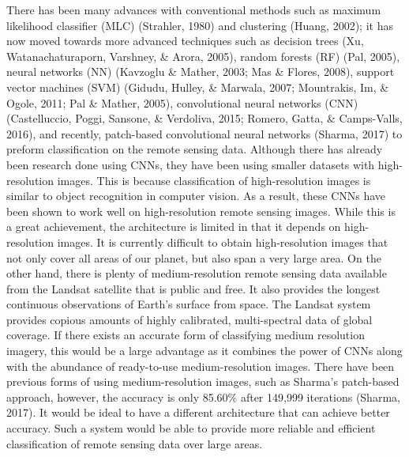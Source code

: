 \documentclass{article}
\begin{document}
There has been many advances with conventional methods such as maximum likelihood classifier (MLC) (Strahler, 1980) and clustering (Huang, 2002); it has now moved towards more advanced techniques such as decision trees (Xu, Watanachaturaporn, Varshney, \& Arora, 2005), random forests (RF) (Pal, 2005), neural networks (NN) (Kavzoglu \& Mather, 2003; Mas \& Flores, 2008), support vector machines (SVM) (Gidudu, Hulley, \& Marwala, 2007; Mountrakis, Im, \& Ogole, 2011; Pal \& Mather, 2005), convolutional neural networks (CNN) (Castelluccio, Poggi, Sansone, \& Verdoliva, 2015; Romero, Gatta, \& Camps-Valls, 2016), and recently, patch-based convolutional neural networks (Sharma, 2017) to preform classification on the remote sensing data. Although there has already been research done using CNNs, they have been using smaller datasets with high-resolution images. This is because classification of high-resolution images is similar to object recognition in computer vision. As a result, these CNNs have been shown to work well on high-resolution remote sensing images. While this is a great achievement, the architecture is limited in that it depends on high-resolution images. It is currently difficult to obtain high-resolution images that not only cover all areas of our planet, but also span a very large area. On the other hand, there is plenty of medium-resolution remote sensing data available from the Landsat satellite that is public and free. It also provides the longest continuous observations of Earth's surface from space. The Landsat system provides copious amounts of highly calibrated, multi-spectral data of global coverage. If there exists an accurate form of classifying medium resolution imagery, this would be a large advantage as it combines the power of CNNs along with the abundance of ready-to-use medium-resolution images. There have been previous forms of using medium-resolution images, such as Sharma’s patch-based approach, however, the accuracy is only 85.60\% after 149,999 iterations (Sharma, 2017). It would be ideal to have a different architecture that can achieve better accuracy. Such a system would be able to provide more reliable and efficient classification of remote sensing data over large areas.
\end{document}
